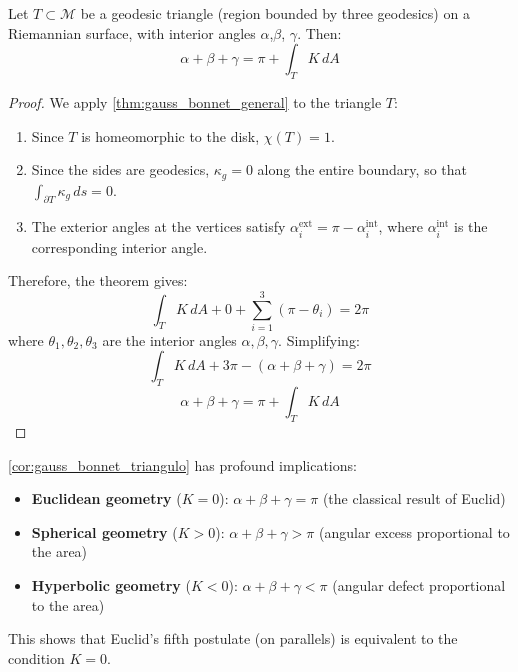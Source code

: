 \begin{corollary}\label{cor:gauss_bonnet_triangulo}
Let $T \subset \mathcal{M}$ be a geodesic triangle (region bounded by three geodesics) on a Riemannian surface, with interior angles $\alpha$,$\beta$, $\gamma$. Then:
\begin{equation}\label{eq:gauss_bonnet_triangulo_apendice}
\alpha + \beta + \gamma = \pi + \int_T K \, dA
\end{equation}
\end{corollary}

\begin{proof}
We apply \autoref{thm:gauss_bonnet_general} to the triangle $T$:
\begin{enumerate}
    \item Since $T$ is homeomorphic to the disk, $\chi(T) = 1$.
    \item Since the sides are geodesics, $\kappa_g = 0$ along the entire boundary, so  that $\int_{\partial T} \kappa_g \, ds = 0$.
    \item The exterior angles at the vertices satisfy $\alpha_i^{\text{ext}} = \pi - \alpha_i^{\text{int}}$, where $\alpha_i^{\text{int}}$ is the corresponding interior angle.
\end{enumerate}

Therefore, the theorem gives:
\[
\int_T K \, dA + 0 + \sum_{i=1}^3 (\pi - \theta_i) = 2\pi
\]
where $\theta_1, \theta_2, \theta_3$ are the interior angles $\alpha, \beta, \gamma$. Simplifying:
\[
\int_T K \, dA + 3\pi - (\alpha + \beta + \gamma) = 2\pi
\]
\[
\alpha + \beta + \gamma = \pi + \int_T K \, dA
\]
\end{proof}

\begin{remark}
\autoref{cor:gauss_bonnet_triangulo} has profound implications:
\begin{itemize}
    \item \textbf{Euclidean geometry} ($K = 0$): $\alpha + \beta + \gamma = \pi$ (the classical result of Euclid)
    \item \textbf{Spherical geometry} ($K > 0$): $\alpha + \beta + \gamma > \pi$ (angular excess proportional to the area)
    \item \textbf{Hyperbolic geometry} ($K < 0$): $\alpha + \beta + \gamma < \pi$ (angular defect proportional to the area)
\end{itemize}
This shows that Euclid's fifth postulate (on parallels) is equivalent to the condition $K = 0$.
\end{remark}

